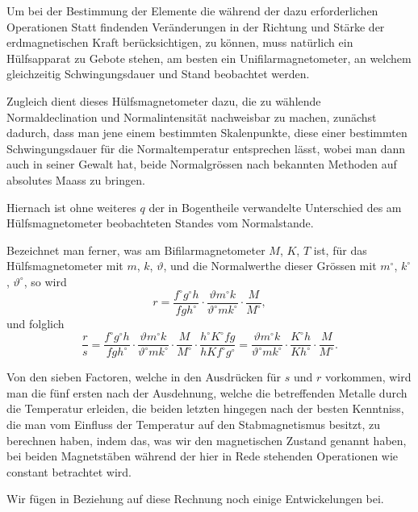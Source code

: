 \documentclass[12pt,a4paper]{article}
\begin{document}
Um bei der Bestimmung der Elemente die während der dazu erforderlichen Operationen Statt findenden Veränderungen in der Richtung und Stärke der erdmagnetischen Kraft berücksichtigen, zu können, muss natürlich ein Hülfsapparat zu Gebote stehen, am besten ein Unifilarmagnetometer, an welchem gleichzeitig Schwingungsdauer und Stand beobachtet werden.

Zugleich dient dieses Hülfsmagnetometer dazu, die zu wählende Normaldeclination und Normalintensität nachweisbar zu machen, zunächst dadurch, dass man jene einem bestimmten Skalenpunkte, diese einer bestimmten Schwingungsdauer für die Normaltemperatur entsprechen lässt, wobei man dann auch in seiner Gewalt hat, beide Normalgrössen nach bekannten Methoden auf absolutes Maass zu bringen.

Hiernach ist ohne weiteres $q$ der in Bogentheile verwandelte Unterschied des am Hülfsmagnetometer beobachteten Standes vom Normalstande.

Bezeichnet man ferner, was am Bifilarmagnetometer $M$, $K$, $T$ ist, für das Hülfsmagnetometer mit $m$, $k$, $\vartheta$, und die Normalwerthe dieser Grössen mit $m^{\circ}$, $k^{\circ}$, $\vartheta^{\circ}$, so wird
\begin{equation}
r = \frac{f^{\circ}g^{\circ}h}{fgh^{\circ}} \cdot \frac{\vartheta m^{\circ} k}{\vartheta^{\circ} m k^{\circ}} \cdot \frac{M}{M^{\circ}},
\end{equation}
und folglich
\begin{equation}
\frac{r}{s} = \frac{f^{\circ}g^{\circ}h}{fgh^{\circ}} \cdot \frac{\vartheta m^{\circ} k}{\vartheta^{\circ} m k^{\circ}} \cdot \frac{M}{M^{\circ}} \cdot \frac{h^{\circ}K^{\circ}fg}{hKf^{\circ}g^{\circ}} = \frac{\vartheta m^{\circ} k}{\vartheta^{\circ} m k^{\circ}} \cdot \frac{K^{\circ}h}{Kh^{\circ}} \cdot \frac{M}{M^{\circ}}.
\end{equation}

Von den sieben Factoren, welche in den Ausdrücken für $s$ und $r$ vorkommen, wird man die fünf ersten nach der Ausdehnung, welche die betreffenden Metalle durch die Temperatur erleiden, die beiden letzten hingegen nach der besten Kenntniss, die man vom Einfluss der Temperatur auf den Stabmagnetismus besitzt, zu berechnen haben, indem das, was wir den magnetischen Zustand genannt haben, bei beiden Magnetstäben während der hier in Rede stehenden Operationen wie constant betrachtet wird.

Wir fügen in Beziehung auf diese Rechnung noch einige Entwickelungen bei.
\end{document}
